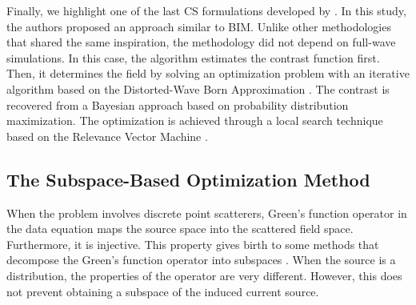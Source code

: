 			Finally, we highlight one of the last CS formulations developed by \cite{oliveri2019compressive}. In this study, the authors proposed an approach similar to BIM. Unlike other methodologies that shared the same inspiration, the methodology did not depend on full-wave simulations. In this case, the algorithm estimates the contrast function first. Then, it determines the field by solving an optimization problem with an iterative algorithm based on the Distorted-Wave Born Approximation \citep{caorsi1996iterative}. The contrast is recovered from a Bayesian approach based on probability distribution maximization. The optimization is achieved through a local search technique based on the Relevance Vector Machine \citep{oliveri2017compressive}.
			
		\subsection{The Subspace-Based Optimization Method}\label{chap:methods:deterministic:som}
		
			When the problem involves discrete point scatterers, Green's function operator in the data equation maps the source space into the scattered field space. Furthermore, it is injective. This property gives birth to some methods that decompose the Green's function operator into subspaces \citep{kirsch2002music,chen2008music}. When the source is a distribution, the properties of the operator are very different. However, this does not prevent obtaining a subspace of the induced current source.
			
